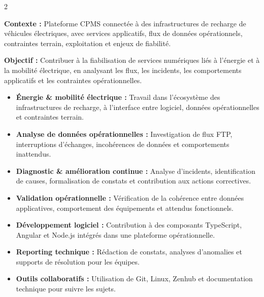 \documentclass[8pt,a4paper,ragged2e,withhyper]{altacv}
\begin{document}



\makecvheader
\vspace{-0.3cm}


\begin{paracol}{2}



\textbf{Contexte :} Plateforme CPMS connectée à des infrastructures de recharge de véhicules électriques, avec services applicatifs, flux de données opérationnels, contraintes terrain, exploitation et enjeux de fiabilité.

\textbf{Objectif :} Contribuer à la fiabilisation de services numériques liés à l'énergie et à la mobilité électrique, en analysant les flux, les incidents, les comportements applicatifs et les contraintes opérationnelles.

\begin{itemize}
  \item \textbf{Énergie \& mobilité électrique :} Travail dans l'écosystème des infrastructures de recharge, à l'interface entre logiciel, données opérationnelles et contraintes terrain.
  \item \textbf{Analyse de données opérationnelles :} Investigation de flux FTP, interruptions d'échanges, incohérences de données et comportements inattendus.
  \item \textbf{Diagnostic \& amélioration continue :} Analyse d'incidents, identification de causes, formalisation de constats et contribution aux actions correctives.
  \item \textbf{Validation opérationnelle :} Vérification de la cohérence entre données applicatives, comportement des équipements et attendus fonctionnels.
  \item \textbf{Développement logiciel :} Contribution à des composants TypeScript, Angular et Node.js intégrés dans une plateforme opérationnelle.
  \item \textbf{Reporting technique :} Rédaction de constats, analyses d'anomalies et supports de résolution pour les équipes.
  \item \textbf{Outils collaboratifs :} Utilisation de Git, Linux, Zenhub et documentation technique pour suivre les sujets.
\end{itemize}


\end{paracol}
\end{document}
